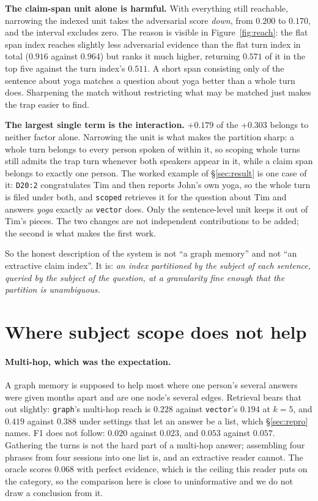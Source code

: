 \documentclass[11pt]{article}
\newcommand{\arm}[1]{\texttt{#1}}
\begin{document}
\textbf{The claim-span unit alone is harmful.} With everything still reachable,
narrowing the indexed unit takes the adversarial score \emph{down}, from
$0.200$ to $0.170$, and the interval excludes zero. The reason is visible in
Figure~\ref{fig:reach}: the flat span index reaches slightly less adversarial
evidence than the flat turn index in total ($0.916$ against $0.964$) but ranks
it much higher, returning $0.571$ of it in the top five against the turn
index's $0.511$. A short span consisting only of the sentence about yoga
matches a question about yoga better than a whole turn does. Sharpening the match without restricting
what may be matched just makes the trap easier to find.

\textbf{The largest single term is the interaction.} $+0.179$ of the $+0.303$
belongs to neither factor alone. Narrowing the unit is what makes the partition
sharp: a whole turn belongs to every person spoken of within it, so scoping
whole turns still admits the trap turn whenever both speakers appear in it,
while a claim span belongs to exactly one person. The worked example of
\S\ref{sec:result} is one case of it: \texttt{D20:2} congratulates Tim and then
reports John's own yoga, so the whole turn is filed under both, and \arm{scoped}
retrieves it for the question about Tim and answers \emph{yoga} exactly as
\arm{vector} does. Only the sentence-level unit keeps it out of Tim's pieces. The two changes are not
independent contributions to be added; the second is what makes the first work.

So the honest description of the system is not ``a graph memory'' and not ``an
extractive claim index''. It is: \emph{an index partitioned by the subject of
each sentence, queried by the subject of the question, at a granularity fine
enough that the partition is unambiguous.}

\section{Where subject scope does not help}
\label{sec:where-not}

\paragraph{Multi-hop, which was the expectation.} A graph memory is supposed to
help most where one person's several answers were given months apart and are
one node's several edges. Retrieval bears that out slightly: \arm{graph}'s
multi-hop reach is $0.228$ against \arm{vector}'s $0.194$ at $k=5$, and $0.419$
against $0.388$ under settings that let an answer be a list, which
\S\ref{sec:repro} names. F1 does not follow: $0.020$ against
$0.023$, and $0.053$ against $0.057$. Gathering the turns is not the hard part
of a multi-hop answer; assembling four phrases from four sessions into one list
is, and an extractive reader cannot. The oracle scores $0.068$ with perfect
evidence, which is the ceiling this reader puts on the category, so the
comparison here is close to uninformative and we do not draw a conclusion from
it.
\end{document}
